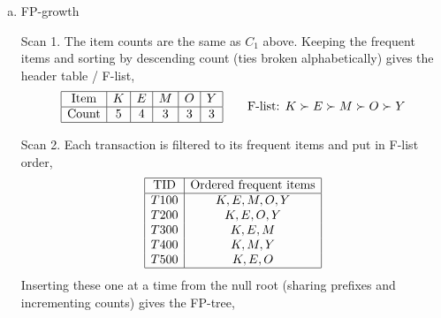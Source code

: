 \documentclass[12pt,letterpaper, onecolumn]{exam}
\begin{document}
\begin{questions}
\begin{solution}
\begin{enumerate}[a.)]
            \item FP-growth

            Scan 1. The item counts are the same as $C_1$ above. Keeping the frequent items and sorting by descending count (ties broken alphabetically) gives the header table / F-list,
            \begin{equation*}
                \begin{array}{|c|c|c|c|c|c|}
                    \hline \text{Item} & K & E & M & O & Y \\ \hline
                    \text{Count} & 5 & 4 & 3 & 3 & 3 \\ \hline
                \end{array}
                \qquad \text{F-list: } K \succ E \succ M \succ O \succ Y
            \end{equation*}

            Scan 2. Each transaction is filtered to its frequent items and put in F-list order,
            \begin{equation*}
                \begin{array}{|c|c|}
                    \hline \text{TID} & \text{Ordered frequent items} \\ \hline
                    T100 & K, E, M, O, Y \\
                    T200 & K, E, O, Y \\
                    T300 & K, E, M \\
                    T400 & K, M, Y \\
                    T500 & K, E, O \\ \hline
                \end{array}
            \end{equation*}
            Inserting these one at a time from the null root (sharing prefixes and incrementing counts) gives the FP-tree,
            \begin{center}
                \label{fig:Q2_fptree}
            \end{center}


\end{enumerate}
\end{solution}
\end{questions}
\end{document}

